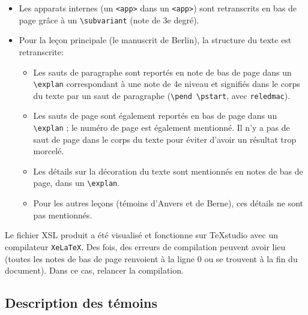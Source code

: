 \documentclass[12pt, a4paper]{article}
\begin{document}
\begin{itemize}
{            		dans une note de deuxième niveau (\texttt{\textbackslash group}, en \LaTeX). Si un 
            		\texttt{<rdgGrp>} contient une partie du témoin principal, il n'est 
            		pas retranscrit en \LaTeX.}
            	\item{Les apparats internes (un \texttt{<app>} dans un 
            		\texttt{<app>}) sont retranscrits en bas de page grâce à un 
            		\texttt{\textbackslash subvariant} (note de 3e degré).}
            	\item{Pour la leçon principale (le manuscrit de Berlin), la structure du 
            		texte est retranscrite:}
            		\begin{itemize}
            			\item{Les sauts de paragraphe sont reportés en note de 
            				bas de page dans un \texttt{\textbackslash explan} correspondant à une note de 4e niveau 
            				et signifiés dans le corps du texte par un saut de paragraphe 
            				(\texttt{\textbackslash pend \textbackslash pstart}, avec \texttt{reledmac}).} 
            			\item{Les sauts de page sont également reportés en bas de page dans un 
            				\texttt{\textbackslash explan} ; le numéro de page est également mentionné. Il n'y a 
            				pas de saut de page dans le corps du texte pour éviter d'avoir un résultat 
            				trop morcelé.}
            			\item{Les détails sur la décoration du texte sont mentionnés en notes de 
            				bas de page, dans un \texttt{\textbackslash explan}.}
            			\item{Pour les autres leçons (témoins d'Anvers et de Berne), ces 
            				détails ne sont pas mentionnés.}
            	\end{itemize}
            \end{itemize} 
            
            \indent Le fichier XSL produit a été visualisé et fonctionne sur TeXstudio 
            avec un compilateur \texttt{XeLaTeX}. Des fois, des erreurs de compilation 
            peuvent avoir lieu (toutes les notes de bas de page renvoient à la ligne 0 
            ou se trouvent à la fin du document). Dans ce cas, relancer la compilation.
        
                \subsection{Description des témoins}
                \\~\\\\~\\
\end{document}
